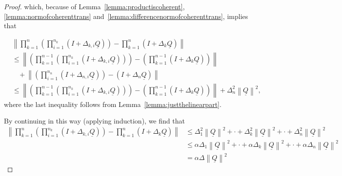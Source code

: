 \documentclass[10pt]{paper}
\theoremstyle{definition}
\newcommand{\lrate}{\underline{Q}}
\newcommand{\norm}[1]{\left\lVert #1 \right\rVert}
\begin{document}
\begin{proof}
\noindent
which, because of Lemma~\ref{lemma:productiscoherent}, \ref{lemma:normofcoherenttrans} and~\ref{lemma:differencenormofcoherenttrans}, implies that

\begin{align*}
&\norm{\prod_{k=1}^n\left(\prod_{i=1}^{n_k}(I+\Delta_{k,i}\lrate)\right)
-
\prod_{k=1}^n(I+\Delta_k\lrate)
}\\
&\leq\norm{
\left(
\prod_{k=1}^{n-1}\left(\prod_{i=1}^{n_k}(I+\Delta_{k,i}\lrate)\right)
\right)
-
\left(\prod_{k=1}^{n-1}(I+\Delta_k\lrate)\right)
}\\
&~~~~+\norm{
\left(\prod_{i=1}^{n_n}(I+\Delta_{n,i}\lrate)\right)
-
(I+\Delta_n\lrate)
}\\
&\leq
\norm{
\left(
\prod_{k=1}^{n-1}\left(\prod_{i=1}^{n_k}(I+\Delta_{k,i}\lrate)\right)
\right)
-
\left(\prod_{k=1}^{n-1}(I+\Delta_k\lrate)\right)
}
+
\Delta_n^2\norm{\lrate}^2,
\end{align*}
where the last inequality follows from Lemma~\ref{lemma:justthelinearpart}.

By continuing in this way (applying induction), we find that
\begin{align*}
\norm{\prod_{k=1}^n\left(\prod_{i=1}^{n_k}(I+\Delta_{k,i}\lrate)\right)
-
\prod_{k=1}^n(I+\Delta_k\lrate)
}
&\leq
\Delta_1^2\norm{\lrate}^2+\cdot+\Delta_k^2\norm{\lrate}^2+\cdot
+
\Delta_n^2\norm{\lrate}^2\\
&\leq
\alpha\Delta_1\norm{\lrate}^2+\cdot+\alpha\Delta_k\norm{\lrate}^2+\cdot
+
\alpha\Delta_n\norm{\lrate}^2\\
&=
\alpha\Delta\norm{\lrate}^2
\end{align*}
\end{proof}
\end{document}
